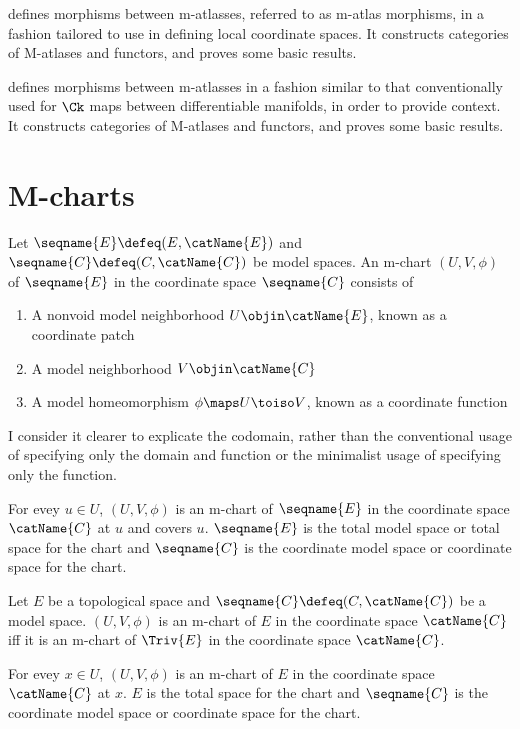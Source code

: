\documentclass{article}
\begin{document}
 defines morphisms between m-atlasses, referred to
as m-atlas morphisms, in a fashion tailored to use in defining local
coordinate spaces. It constructs categories of M-atlases and functors,
and proves some basic results.

 defines morphisms between m-atlasses in a
fashion similar to that conventionally used for $\Ck$ maps between
differentiable manifolds, in order to provide context. It constructs
categories of M-atlases and functors, and proves some basic results.

\section{M-charts}
{
  \showlabelsinline
  \label{sec:M-charts}
}
\begin{definition}[M-charts]
\label{def:M-chart}
Let $\seqname{E} \defeq (E, \catName{E})$ and
$\seqname{C} \defeq (C,\catName{C})$ be model spaces. An m-chart
$(U, V, \phi)$ of $\seqname{E}$ in the coordinate space $\seqname{C}$
consists of
\begin{enumerate}
\item A nonvoid model neighborhood $U \objin \catName{E}$, known as a
coordinate patch
\item A model neighborhood $V\objin \catName{C}$
\item A model homeomorphism $\phi \maps U \toiso V$, known as a
coordinate function
\end{enumerate}
\begin{remark}
I consider it clearer to explicate the codomain, rather than the
conventional usage of specifying only the domain and function or the
minimalist usage of specifying only the function.
\end{remark}
For evey $u \in U$, $(U, V, \phi)$ is an m-chart of $\seqname{E}$ in the
coordinate space $\catName{C}$ at $u$ and covers $u$.
$\seqname{E}$ is the total model space or total space for the chart and
$\seqname{C}$ is the coordinate model space or coordinate space for the
chart.

Let $E$ be a topological space and $\seqname{C} \defeq (C,\catName{C})$
be a model space. $(U, V, \phi)$ is an m-chart of $E$ in the coordinate
space $\catName{C}$ iff it is an m-chart of $\Triv{E}$ in the coordinate
space $\catName{C}$.

For evey $x \in U$, $(U, V, \phi)$ is an m-chart of $E$ in the
coordinate space $\catName{C}$ at $x$.
$E$ is the total space for the chart and $\seqname{C}$ is the coordinate
model space or coordinate space for the chart.
\end{definition}
\end{document}
